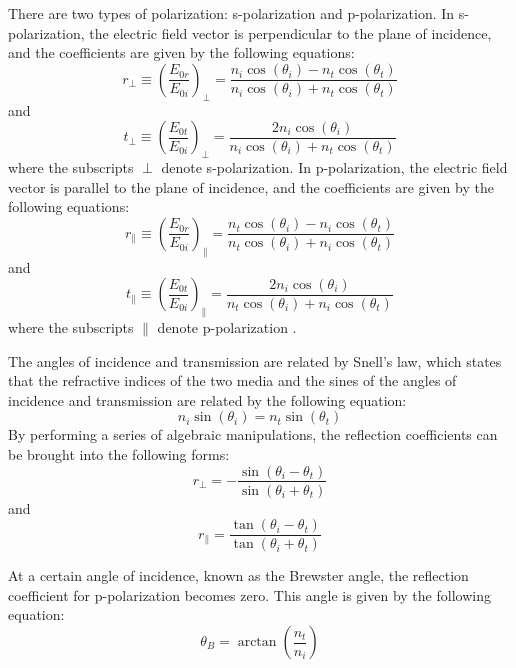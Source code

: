 \documentclass[10pt]{article}
\begin{document}
There are two types of polarization: s-polarization and p-polarization. In s-polarization, the electric field vector is perpendicular to the plane of incidence, and the coefficients are given by the following equations:
\begin{equation}
  r_{\perp} \equiv \left(\frac{E_{0r}}{E_{0i}}\right)_{\perp} = \frac{n_i \cos(\theta_i) - n_t \cos(\theta_t)}{n_i \cos(\theta_i) + n_t \cos(\theta_t)}
\end{equation}
and
\begin{equation}
  t_{\perp} \equiv \left(\frac{E_{0t}}{E_{0i}}\right)_{\perp} = \frac{2n_i \cos(\theta_i)}{n_i \cos(\theta_i) + n_t \cos(\theta_t)}
\end{equation}
where the subscripts $\perp$ denote s-polarization. In p-polarization, the electric field vector is parallel to the plane of incidence, and the coefficients are given by the following equations:
\begin{equation}
  r_{\parallel} \equiv \left(\frac{E_{0r}}{E_{0i}}\right)_{\parallel} = \frac{n_t \cos(\theta_i) - n_i \cos(\theta_t)}{n_t \cos(\theta_i) + n_i \cos(\theta_t)}
\end{equation}
and
\begin{equation}
  t_{\parallel} \equiv \left(\frac{E_{0t}}{E_{0i}}\right)_{\parallel} = \frac{2n_i \cos(\theta_i)}{n_t \cos(\theta_i) + n_i \cos(\theta_t)}
\end{equation}
where the subscripts $\parallel$ denote p-polarization \cite{Hecht_2017}.

The angles of incidence and transmission are related by Snell's law, which states that the refractive indices of the two media and the sines of the angles of incidence and transmission are related by the following equation:
\begin{equation}
  n_i \sin(\theta_i) = n_t \sin(\theta_t)
\end{equation}
By performing a series of algebraic manipulations, the reflection coefficients can be brought into the following forms:
\begin{equation}
  r_{\perp} = -\frac{\sin(\theta_i - \theta_t)}{\sin(\theta_i + \theta_t)}
\end{equation}
and 
\begin{equation}
  r_{\parallel} = \frac{\tan(\theta_i - \theta_t)}{\tan(\theta_i + \theta_t)}
\end{equation}

At a certain angle of incidence, known as the Brewster angle, the reflection coefficient for p-polarization becomes zero. This angle is given by the following equation:
\begin{equation}
  \theta_B = {\arctan}{\left(\frac{n_t}{n_i}\right)}
\end{equation}
\end{document}

